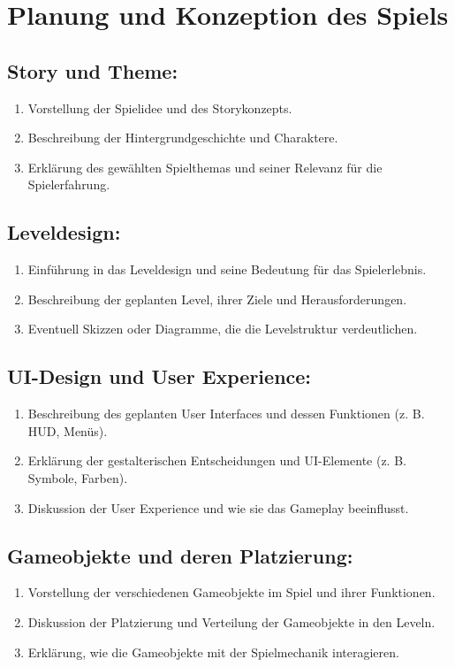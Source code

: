 
\pagebreak
\section{Planung und Konzeption des Spiels}
\subsection{Story und Theme:}
\begin{enumerate}
  \item Vorstellung der Spielidee und des Storykonzepts.
  \item Beschreibung der Hintergrundgeschichte und Charaktere.
  \item Erklärung des gewählten Spielthemas und seiner Relevanz für die Spielerfahrung.
\end{enumerate}

\subsection{Leveldesign:}
\begin{enumerate}
  \item Einführung in das Leveldesign und seine Bedeutung für das Spielerlebnis.
  \item Beschreibung der geplanten Level, ihrer Ziele und Herausforderungen.
  \item Eventuell Skizzen oder Diagramme, die die Levelstruktur verdeutlichen.
\end{enumerate}

\subsection{UI-Design und User Experience:}
\begin{enumerate}
  \item Beschreibung des geplanten User Interfaces und dessen Funktionen (z. B. HUD, Menüs).
  \item Erklärung der gestalterischen Entscheidungen und UI-Elemente (z. B. Symbole, Farben).
  \item Diskussion der User Experience und wie sie das Gameplay beeinflusst.
\end{enumerate}

\subsection{Gameobjekte und deren Platzierung:}
\begin{enumerate}
  \item Vorstellung der verschiedenen Gameobjekte im Spiel und ihrer Funktionen.
  \item Diskussion der Platzierung und Verteilung der Gameobjekte in den Leveln.
  \item Erklärung, wie die Gameobjekte mit der Spielmechanik interagieren.
\end{enumerate}

